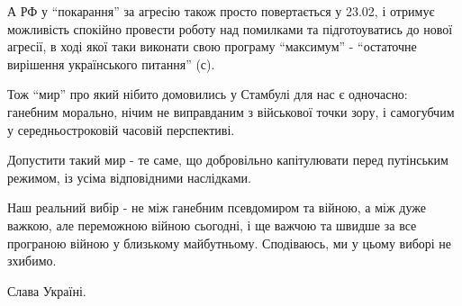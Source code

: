 А РФ у \enquote{покарання} за агресію також просто повертається у 23.02, і отримує
можливість спокійно провести роботу над помилками та підготоуватись до нової
агресії, в ході якої таки виконати свою програму \enquote{максимум} - \enquote{остаточне
вирішення українського питання} (с). 

Тож \enquote{мир} про який нібито домовились у Стамбулі для нас є одночасно: ганебним
морально, нічим не виправданим з військової точки зору, і самогубчим у
середньостроковій часовій перспективі. 

Допустити такий мир - те саме, що добровільно капітулювати перед путінським
режимом, із усіма відповідними наслідками.

Наш реальний вибір - не між ганебним псевдомиром та війною, а між дуже важкою,
але переможною війною сьогодні, і ще важчою та швидше за все програною війною у
близькому майбутньому. Сподіваюсь, ми у цьому виборі не зхибимо.

Слава Україні.

